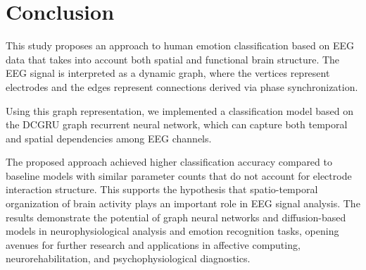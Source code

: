 \documentclass[12pt, twoside]{article}
\begin{document}
\section{Conclusion}

This study proposes an approach to human emotion classification based on EEG data that takes into account both spatial and functional brain structure. The EEG signal is interpreted as a dynamic graph, where the vertices represent electrodes and the edges represent connections derived via phase synchronization.

Using this graph representation, we implemented a classification model based on the DCGRU graph recurrent neural network, which can capture both temporal and spatial dependencies among EEG channels.

The proposed approach achieved higher classification accuracy compared to baseline models with similar parameter counts that do not account for electrode interaction structure. This supports the hypothesis that spatio-temporal organization of brain activity plays an important role in EEG signal analysis. The results demonstrate the potential of graph neural networks and diffusion-based models in neurophysiological analysis and emotion recognition tasks, opening avenues for further research and applications in affective computing, neurorehabilitation, and psychophysiological diagnostics.

\newpage



\end{document}
